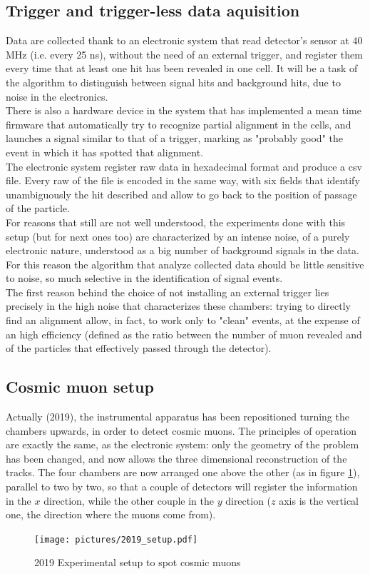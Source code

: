 \documentclass[a4paper,11pt]{book}
\begin{document}
\subsection{Trigger and trigger-less data aquisition}

Data are collected thank to an electronic system that read detector's sensor at 40 MHz (i.e. every 25 ns), without the need of an external trigger, and register them every time that at least one hit has been revealed in one cell. It will be a task of the algorithm to distinguish between signal hits and background hits, due to noise in the electronics.\\
There is also a hardware device in the system that  has implemented a mean time firmware that automatically try to recognize partial alignment in the cells, and launches a signal similar to that of a trigger, marking as "probably good" the event in which it has spotted that alignment.\\
The electronic system register raw data in hexadecimal format and produce a csv file. Every raw of the file is encoded in the same way, with six fields that identify unambiguously the hit described and allow to go back to the position of passage of the particle.\\
For reasons that still are not well understood, the experiments done with this setup (but for next ones too) are characterized by an intense noise, of a purely electronic nature, understood as a big number of background signals in the data. For this reason the algorithm that analyze collected data should be little sensitive to noise, so much selective in the identification of signal events.\\
The first reason behind the choice of not installing an external trigger lies precisely in the high noise that characterizes these chambers: trying to directly find an alignment allow, in fact, to work only to "clean" events, at the expense of an high efficiency (defined as the ratio between the number of muon revealed and of the particles that effectively passed through the detector).\\



\subsection{Cosmic muon setup}

Actually (2019), the instrumental apparatus has been repositioned turning the chambers upwards, in order to detect cosmic muons. The principles of operation are exactly the same, as the electronic system: only the geometry of the problem has been changed, and now allows the three dimensional reconstruction of the tracks. The four chambers are now arranged one above the other (as in figure \ref{fig:2019_esp_setup}), parallel to two by two, so that a couple of detectors will register the information in the $x$ direction, while the other couple in the $y$ direction ($z$ axis is the vertical one, the direction where the muons come from).
\begin{figure}[!hbtp]
\centering
\texttt{[image: pictures/2019\_setup.pdf]}
\caption{2019 Experimental setup to spot cosmic muons}
\label{fig:2019_esp_setup}
\end{figure}
\end{document}
